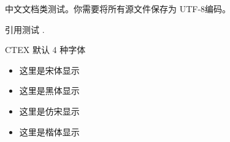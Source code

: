 \documentclass[UTF8]{ctexart}
\begin{document}
中文文档类测试。你需要将所有源文件保存为 UTF-8编码。

引用测试 \cite{lozanoGlobalRegionalMortality2012}.

CTEX 默认 4 种字体

\begin{itemize}
    \item {\songti 这里是宋体显示}
    \item {\heiti 这里是黑体显示}
    \item {\fangsong 这里是仿宋显示}
    \item {\kaishu 这里是楷体显示}
\end{itemize}

\end{document}
